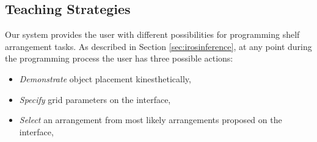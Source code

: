 
\subsection{Teaching Strategies}
\label{sec:irosstrategies}

Our system provides the user with different possibilities for programming shelf arrangement tasks. 
As described in Section \ref{sec:irosinference}, at any point during the programming process the user has three possible actions:
\begin{itemize}
	\item \textit{Demonstrate} object placement kinesthetically, %
	\item \textit{Specify} grid parameters on the interface, %
	\item \textit{Select} an arrangement from most likely arrangements proposed on the interface, %
\end{itemize}

